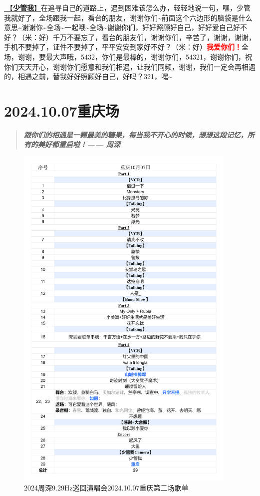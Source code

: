 \documentclass[]{ctexbook}
\begin{document}
\hyperref[watch-ur-manners]{🎵【\textbf{少管我}】}在追寻自己的道路上，遇到困难该怎么办，轻轻地说一句，嘿，少管我就好了，全场跟我一起，看台的朋友，谢谢你们\textasciitilde 前面这个六边形的脑袋是什么意思\textasciitilde 谢谢你\textasciitilde 全场\textasciitilde 一起哦\textasciitilde 全场\textasciitilde 谢谢你们，好好照顾好自己，好好爱自己好不好？（米：好）千万不要忘了，看台的朋友们，谢谢你们，辛苦了，谢谢，谢谢，手机不要掉了，证件不要掉了，平平安安到家好不好？（米：好）\textbf{\textcolor{red}{我爱你们！}}全场，谢谢，要最大声哦，5432，你们是最棒的，谢谢你们，54321，谢谢你们，祝你们天天开心，谢谢你们愿意和我们相遇，让我们同频，谢谢，我们一定会再相遇的，相遇之前，替我好好照顾好自己，好吗？321，嘿\textasciitilde{}

\chapter{2024.10.07重庆场}\label{chongqing-20241007}

\begin{quote}
\textbf{\emph{跟你们的相遇是一颗最美的糖果，每当我不开心的时候，想想这段记忆，所有的美好都重启啦！------ 周深}}
\end{quote}

\begin{figure}

{\centering \includegraphics[width=300pt]{img/playlists/playlists-chongqing-20241007} 

}

\caption{2024周深9.29Hz巡回演唱会2024.10.07重庆第二场歌单}\label{fig:unnamed-chunk-117}
\end{figure}
\end{document}
